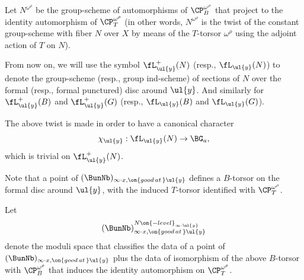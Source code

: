 \documentclass[9pt]{amsart}
\theoremstyle{definition}
\theoremstyle{remark}
\numberwithin{equation}{section}
\begin{document}
\medskip

Let $N^{\omega^\rho}$ be the group-scheme of automorphisms of $\CP^{\omega^\rho}_B$ that
project to the identity automorphism of $\CP^{\omega^\rho}_T$ (in other words, $N^{\omega^\rho}$ is the twist of the constant
group-scheme with fiber $N$ over $X$ by means of the $T$-torsor $\omega^\rho$ using the adjoint action of $T$ on $N$).

\medskip

From now on, we will use the symbol
$\fL^+_{\ul{y}}(N)$ (resp., $\fL_{\ul{y}}(N)$) to denote the group-scheme (resp., group ind-scheme) of 
sections of $N$ over the formal (resp., formal punctured) disc around $\ul{y}$. And similarly for 
$\fL^+_{\ul{y}}(B)$ and $\fL^+_{\ul{y}}(G)$ (resp., $\fL_{\ul{y}}(B)$ and $\fL_{\ul{y}}(G)$). 

\medskip

The above twist is made in order to have a canonical character
$$\chi_{\ul{y}}:\fL_{\ul{y}}(N)\to \BG_a,$$
which is trivial on $\fL^+_{\ul{y}}(N)$. 











\sssec{}

Note that a point of $(\BunNb)_{\infty\cdot x,\on{good\,at\,}\ul{y}}$ defines a $B$-torsor on the formal disc around $\ul{y}$, with the 
induced $T$-torsor identified with $\CP^{\omega^\rho}_T$. 

\medskip

Let 
$$(\BunNb)^{N\on{-level}_{\infty\cdot \ul{y}}}_{\infty\cdot x,\on{good\,at\,}\ul{y}}$$
denote the moduli space that classifies the data of a point of $(\BunNb)_{\infty\cdot x,\on{good\,at\,}\ul{y}}$
plus the data of isomorphism of the above $B$-torsor with $\CP^{\omega^\rho}_B$ that induces the identity 
automorphism on $\CP^{\omega^\rho}_T$. 
\end{document}
